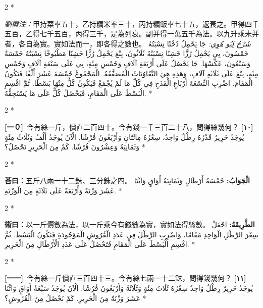 \documentclass[11pt,a4paper]{article}
\newcommand{\ar}[1]{\arabicfont\beginR #1\endR}
\newcommand{\problemnum}[1]{\textbf{[\ignorespaces#1\unskip]}}
\newenvironment{bilingual}{%
  \begin{paracol}{2}%
  \switchcolumn[0]*%
}{%
  \end{paracol}%
}
\newcommand{\cnline}[1]{\switchcolumn[0]\noindent #1 \switchcolumn[1]}
\newcommand{\arline}[1]{\noindent\ar{#1} \switchcolumn[0]*}
\newenvironment{prob bilingual}{%
  \begin{paracol}{2}%
  \switchcolumn[0]*%
}{%
  \end{paracol}%
  \vspace{0.3em}%
}
\begin{document}
\begin{bilingual}
\cnline{%
\textcolor{commentarycolor}{\small\textit{劉徽注：}}甲持粟率五十，乙持糲米率三十，丙持糲飯率七十五，返衰之。甲得四千五百，乙得七千五百，丙得三千，是為列衰。副并得一萬五千為法。以九升乘未并者，各自為實。實如法而一，即各得之數也。
}
\arline{%
\textcolor{commentarycolor}{\small\textit{شَرْحُ لِيُو هُوِي:}} جَا يَحْمِلُ دُخْنًا نِسْبَتُهُ خَمْسُونَ، يِي يَحْمِلُ رُزًّا خَشِنًا نِسْبَتُهُ ثَلَاثُونَ، بِنْغ يَحْمِلُ رُزًّا خَشِنًا مَطْبُوخًا نِسْبَتُهُ خَمْسَةٌ وَسَبْعُونَ، عَكِّسْهَا. جَا يَحْصُلُ عَلَى أَرْبَعَةِ آلَافٍ وَخَمْسِ مِئَةٍ، يِي عَلَى سَبْعَةِ آلَافٍ وَخَمْسِ مِئَةٍ، بِنْغ عَلَى ثَلَاثَةِ آلَافٍ، وَهَذِهِ هِيَ التَّفَاوُتَاتُ الْمُصَفَّفَةُ. الْمَجْمُوعُ خَمْسَةَ عَشَرَ أَلْفًا فَتَكُونُ الْمَقَامَ. اضْرِبِ التِّسْعَةَ أَرْبَاعِ الْقَدَحِ فِي كُلِّ مَا لَمْ يُجْمَعْ فَيَكُونُ كُلٌّ مِنْهَا بَسْطًا. ثُمَّ اقْسِمِ الْبَسْطَ عَلَى الْمَقَامِ، فَيَحْصُلُ كُلٌّ عَلَى مَا يَسْتَحِقُّهُ.
}
\end{bilingual}

\begin{bilingual}
\cnline{\problemnum{一０}\, 今有絲一斤，價直二百四十。今有錢一千三百二十八，問得絲幾何？}
\arline{\problemnum{١٠}\, يُوجَدُ حَرِيرٌ قَدْرُهُ رِطْلٌ وَاحِدٌ، سِعْرُهُ مِائَتَانِ وَأَرْبَعُونَ قُرْشًا. الْآنَ يُوجَدُ أَلْفُ وَثَلَاثُ مِئَةٍ وَثَمَانِيَةٌ وَعِشْرُونَ قُرْشًا. كَمْ مِنَ الْحَرِيرِ نَحْصُلُ؟}
\end{bilingual}

\begin{bilingual}
\cnline{\textcolor{answercolor}{\textbf{荅曰：}}五斤八兩一十二銖、三分銖之四。}
\arline{\textcolor{answercolor}{\textbf{الْجَوَابُ:}} خَمْسَةُ أَرْطَالٍ وَثَمَانِيَةُ أَوَاقٍ وَاثْنَا عَشَرَ وَزْنَةً وَأَرْبَعَةٌ عَلَى ثَلَاثَةٍ مِنَ الْوَزْنَةِ.}
\end{bilingual}

\begin{bilingual}
\cnline{%
\textcolor{methodcolor}{\textbf{術曰：}}以一斤價數為法，以一斤乘今有錢數為實，實如法得絲數。
}
\arline{%
\textcolor{methodcolor}{\textbf{الطَّرِيقَةُ:}} اجْعَلْ سِعْرَ الرِّطْلِ الْوَاحِدِ مَقَامًا، وَاضْرِبِ الرِّطْلَ فِي عَدَدِ الْقُرُوشِ الْمَوْجُودَةِ فَتَكُونُ الْبَسْطَ. ثُمَّ اقْسِمِ الْبَسْطَ عَلَى الْمَقَامِ فَتَحْصُلُ عَلَى عَدَدِ الْأَرْطَالِ مِنَ الْحَرِيرِ.
}
\end{bilingual}

\begin{bilingual}
\cnline{\problemnum{一一}\, 今有絲一斤價直三百四十三。今有絲七兩一十二銖，問得錢幾何？}
\arline{\problemnum{١١}\, يُوجَدُ حَرِيرٌ رِطْلٌ وَاحِدٌ سِعْرُهُ ثَلَاثَ مِئَةٍ وَثَلَاثَةٌ وَأَرْبَعُونَ قُرْشًا. الْآنَ يُوجَدُ سَبْعَةُ أَوَاقٍ وَاثْنَا عَشَرَ وَزْنَةً مِنَ الْحَرِيرِ. كَمْ نَحْصُلُ مِنَ الْقُرُوشِ؟}
\end{bilingual}
\end{document}
